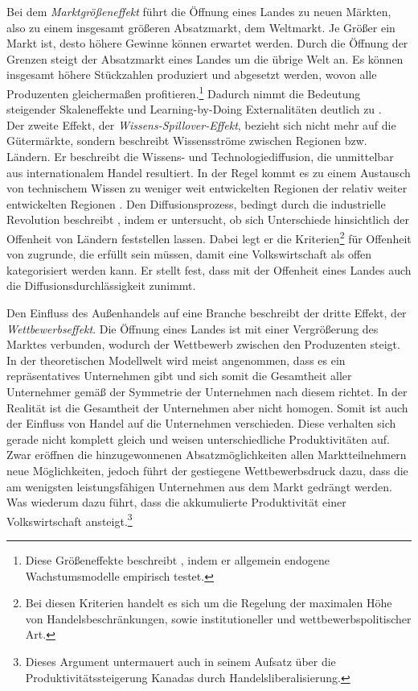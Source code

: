Bei dem \textit{Marktgrö{\ss}eneffekt} f{\"u}hrt die {\"O}ffnung eines Landes zu neuen M{\"a}rkten, also zu einem insgesamt gr{\"o}{\ss}eren Absatzmarkt, dem Weltmarkt. Je Gr{\"o}{\ss}er ein Markt ist, desto h{\"o}here Gewinne k{\"o}nnen erwartet werden. Durch die {\"O}ffnung der Grenzen steigt der Absatzmarkt eines Landes um die {\"u}brige Welt an. Es k{\"o}nnen insgesamt h{\"o}here St{\"u}ckzahlen produziert und abgesetzt werden, wovon alle Produzenten gleicherma{\ss}en profitieren.\footnote{Diese Grö{\ss}eneffekte beschreibt \citet{Jones.1995a}, indem er allgemein endogene Wachstumsmodelle empirisch testet.} Dadurch nimmt die Bedeutung steigender Skaleneffekte und Learning-by-Doing Externalit{\"a}ten deutlich zu \citep[Kapitel 15]{Aghion.1998}.\\


Der zweite Effekt, der \textit{Wissens-Spillover-Effekt}, bezieht sich nicht mehr auf die G{\"u}term{\"a}rkte, sondern beschreibt Wissensstr{\"o}me zwischen Regionen bzw. L{\"a}ndern. Er beschreibt die Wissens- und Technologiediffusion, die unmittelbar aus internationalem Handel resultiert. In der Regel kommt es zu einem Austausch von technischem Wissen zu weniger weit entwickelten Regionen der relativ weiter entwickelten Regionen \citep{Sachs.1995}. 
Den Diffusionsprozess, bedingt durch die industrielle Revolution beschreibt \citet{Lucas.2007}, indem er untersucht, ob sich Unterschiede hinsichtlich der Offenheit von L{\"a}ndern feststellen lassen. Dabei legt er die Kriterien\footnote{Bei diesen Kriterien handelt es sich um die Regelung der maximalen Höhe von Handelsbeschränkungen, sowie institutioneller und wettbewerbspolitischer Art.} f{\"u}r Offenheit von \citet{Sachs.1995} zugrunde, die erf{\"u}llt sein m{\"u}ssen, damit eine Volkswirtschaft als offen kategorisiert werden kann. Er stellt fest, dass mit der Offenheit eines Landes auch die Diffusionsdurchl{\"a}ssigkeit zunimmt.


Den Einfluss des Au{\ss}enhandels auf eine Branche beschreibt der dritte Effekt, der \textit{Wettbewerbseffekt}. Die {\"O}ffnung eines Landes ist mit einer Vergr{\"o}{\ss}erung des Marktes verbunden, wodurch der Wettbewerb zwischen den Produzenten steigt. In der theoretischen Modellwelt wird meist angenommen, dass es ein repr{\"a}sentatives Unternehmen gibt und sich somit die Gesamtheit aller Unternehmer gem{\"a}{\ss} der Symmetrie der Unternehmen nach diesem richtet. In der Realit{\"a}t ist die Gesamtheit der Unternehmen aber nicht homogen. Somit ist auch der Einfluss von Handel auf die Unternehmen verschieden. Diese verhalten sich gerade nicht komplett gleich und weisen unterschiedliche Produktivit{\"a}ten auf. Zwar er{\"o}ffnen die hinzugewonnenen Absatzm{\"o}glichkeiten allen Marktteilnehmern neue M{\"o}glichkeiten, jedoch f{\"u}hrt der gestiegene Wettbewerbsdruck dazu, dass die am wenigsten leistungsf{\"a}higen Unternehmen aus dem Markt gedr{\"a}ngt werden. Was wiederum dazu f{\"u}hrt, dass die akkumulierte Produktivit{\"a}t einer Volkswirtschaft ansteigt.\footnote{Dieses Argument untermauert auch \citet{Trefler.2004} in seinem Aufsatz über die Produktivitätssteigerung Kanadas durch Handelsliberalisierung.}\\


